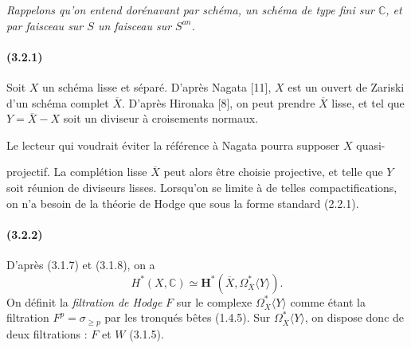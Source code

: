 \documentclass[10pt]{article}
\newcommand{\C}{\mathbb C}
\begin{document}
\emph{Rappelons qu'on entend dorénavant par schéma, un schéma de type fini sur $\C$, et par faisceau sur $S$ un faisceau sur $S^{an}$.}

\paragraph{(3.2.1)} Soit $X$ un schéma lisse et séparé. D'après Nagata [11], $X$ est un ouvert de Zariski d'un schéma complet $\overline X$. D'après Hironaka [8], on peut prendre $\overline X$ lisse, et tel que $Y=\overline X-X$ soit un diviseur à croisements normaux.

Le lecteur qui voudrait éviter la référence à Nagata pourra supposer $X$ quasi-



projectif. La complétion lisse $\overline X$ peut alors être choisie projective, et telle que $Y$ soit réunion de diviseurs lisses. Lorsqu'on se limite à de telles compactifications, on n'a besoin de la théorie de Hodge que sous la forme standard (2.2.1).

\paragraph{(3.2.2)} D'après (3.1.7) et (3.1.8), on a
\[
H^*(X,\C)\simeq \mathbf H^*(\overline X,\Omega_{\overline X}^{*}\langle Y\rangle).
\]
On définit la \emph{filtration de Hodge} $F$ sur le complexe $\Omega_{\overline X}^{*}\langle Y\rangle$ comme étant la filtration $F^p=\sigma_{\ge p}$ par les tronqués bêtes (1.4.5). Sur $\Omega_{\overline X}^{*}\langle Y\rangle$, on dispose donc de deux filtrations : $F$ et $W$ (3.1.5).
\end{document}
